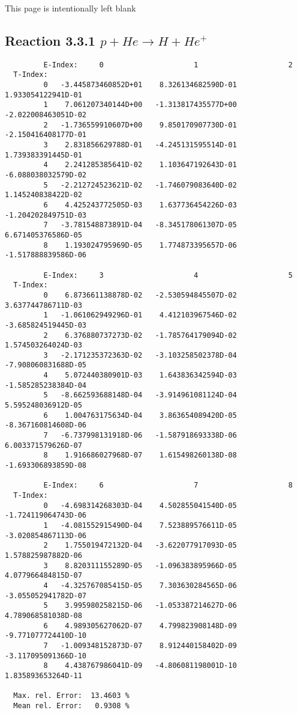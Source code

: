 \newpage
This page is intentionally left blank
\newpage
\subsection{
Reaction 3.3.1  $  p + He \rightarrow  H + He^+ $
}



\begin{verbatim}
         E-Index:     0                     1                     2
  T-Index:
         0   -3.445873460852D+01    8.326134682590D-01    1.933054122941D-01
         1    7.061207340144D+00   -1.313817435577D+00   -2.022008463051D-02
         2   -1.736559910607D+00    9.850170907730D-01   -2.150416408177D-01
         3    2.831856629788D-01   -4.245131595514D-01    1.739383391445D-01
         4    2.241285385641D-02    1.103647192643D-01   -6.088038032579D-02
         5   -2.212724523621D-02   -1.746079083640D-02    1.145240838422D-02
         6    4.425243772505D-03    1.637736454226D-03   -1.204202849751D-03
         7   -3.781548873891D-04   -8.345178061307D-05    6.671405376586D-05
         8    1.193024795969D-05    1.774873395657D-06   -1.517888839586D-06

         E-Index:     3                     4                     5
  T-Index:
         0    6.873661138878D-02   -2.530594845507D-02    3.637744786711D-03
         1   -1.061062949296D-01    4.412103967546D-02   -3.685824519445D-03
         2    6.376880737273D-02   -1.785764179094D-02    1.574503264024D-03
         3   -2.171235372363D-02   -3.103258502378D-04   -7.908060831688D-05
         4    5.072440380901D-03    1.643836342594D-03   -1.585285238384D-04
         5   -8.662593688148D-04   -3.914961081124D-04    5.595248036912D-05
         6    1.004763175634D-04    3.863654089420D-05   -8.367160814608D-06
         7   -6.737998131918D-06   -1.587918693338D-06    6.003371579626D-07
         8    1.916686027968D-07    1.615498260138D-08   -1.693306893859D-08

         E-Index:     6                     7                     8
  T-Index:
         0   -4.698314268303D-04    4.502855041540D-05   -1.724119064743D-06
         1   -4.081552915490D-04    7.523889576611D-05   -3.020854867113D-06
         2    1.755019472132D-04   -3.622077917093D-05    1.578825987882D-06
         3    8.820311155289D-05   -1.096383895966D-05    4.077966484815D-07
         4   -4.325767085415D-05    7.303630284565D-06   -3.055052941782D-07
         5    3.995980258215D-06   -1.053387214627D-06    4.789068581038D-08
         6    4.989305627062D-07    4.799823908148D-09   -9.771077724410D-10
         7   -1.009348152873D-07    8.912440158402D-09   -3.117095091366D-10
         8    4.438767986041D-09   -4.806081198001D-10    1.835893653264D-11

  Max. rel. Error:  13.4603 %
  Mean rel. Error:   0.9308 %



\end{verbatim}

